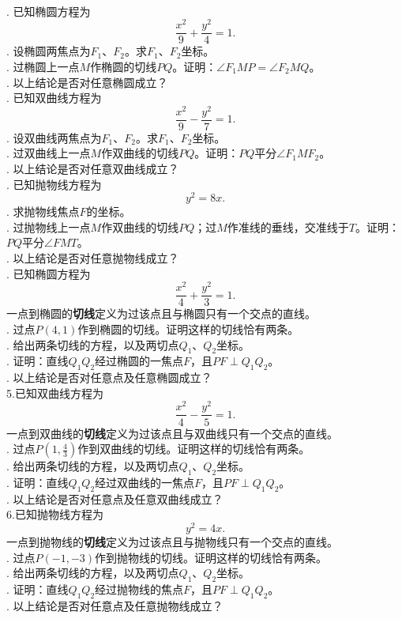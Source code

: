 \documentclass[12pt,UTF8,fontset=none]{ctexbook}
\begin{document}
\begin{xt}
    \mbox{} \\
    . 已知椭圆方程为
    $$ \frac{x^2}{9} + \frac{y^2}{4} = 1.$$
    . 设椭圆两焦点为$F_1$、$F_2$。求$F_1$、$F_2$坐标。\\
    . 过椭圆上一点$M$作椭圆的切线$PQ$。证明：$\angle F_1MP = \angle F_2MQ$。\\
    . 以上结论是否对任意椭圆成立？\\
    . 已知双曲线方程为
    $$ \frac{x^2}{9} - \frac{y^2}{7} = 1.$$
    . 设双曲线两焦点为$F_1$、$F_2$。求$F_1$、$F_2$坐标。\\
    . 过双曲线上一点$M$作双曲线的切线$PQ$。证明：$PQ$平分$\angle F_1MF_2$。\\
    . 以上结论是否对任意双曲线成立？\\
    . 已知抛物线方程为
    $$ y^2 = 8x.$$
    . 求抛物线焦点$F$的坐标。\\
    . 过抛物线上一点$M$作双曲线的切线$PQ$；过$M$作准线的垂线，交准线于$T$。证明：$PQ$平分$\angle FMT$。\\
    . 以上结论是否对任意抛物线成立？\\
    . 已知椭圆方程为
    $$ \frac{x^2}{4} + \frac{y^2}{3} = 1.$$
    一点到椭圆的\textbf{切线}定义为过该点且与椭圆只有一个交点的直线。\\
    . 过点$P(4, 1)$作到椭圆的切线。证明这样的切线恰有两条。\\
    . 给出两条切线的方程，以及两切点$Q_1$、$Q_2$坐标。\\
    . 证明：直线$Q_1Q_2$经过椭圆的一焦点$F$，且$PF\perp Q_1Q_2$。\\
    . 以上结论是否对任意点及任意椭圆成立？\\
    \indent 5.已知双曲线方程为
    $$ \frac{x^2}{4} - \frac{y^2}{5} = 1.$$ 
    一点到双曲线的\textbf{切线}定义为过该点且与双曲线只有一个交点的直线。\\
    . 过点$P\left(1, \frac{4}{3}\right)$作到双曲线的切线。证明这样的切线恰有两条。\\
    . 给出两条切线的方程，以及两切点$Q_1$、$Q_2$坐标。\\
    . 证明：直线$Q_1Q_2$经过双曲线的一焦点$F$，且$PF\perp Q_1Q_2$。\\
    . 以上结论是否对任意点及任意双曲线成立？\\
    \indent 6.已知抛物线方程为
    $$ y^2 = 4x.$$ 
    一点到抛物线的\textbf{切线}定义为过该点且与抛物线只有一个交点的直线。\\
    . 过点$P(-1, -3)$作到抛物线的切线。证明这样的切线恰有两条。\\
    . 给出两条切线的方程，以及两切点$Q_1$、$Q_2$坐标。\\
    . 证明：直线$Q_1Q_2$经过抛物线的焦点$F$，且$PF\perp Q_1Q_2$。\\
    . 以上结论是否对任意点及任意抛物线成立？\\
    
\end{xt}
\end{document}
